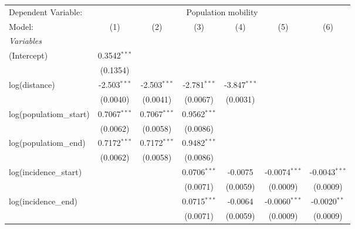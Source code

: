 \documentclass[10pt,a4paper]{article}
\author{Peer Lasse Hinrichsen}
\begin{document}
\begingroup
\centering
\begin{tabular}{lcccccc}
   \tabularnewline \midrule \midrule
   Dependent Variable: & \multicolumn{6}{c}{Population mobility}\\
   Model:                                       & (1)            & (2)            & (3)             & (4)            & (5)             & (6)\\  
   \midrule
   \emph{Variables}\\
   (Intercept)                                  & 0.3542$^{***}$ &                &                 &                &                 &   \\   
                                                & (0.1354)       &                &                 &                &                 &   \\   
   log(distance)                                & -2.503$^{***}$ & -2.503$^{***}$ & -2.781$^{***}$  & -3.847$^{***}$ &                 &   \\   
                                                & (0.0040)       & (0.0041)       & (0.0067)        & (0.0031)       &                 &   \\   
   log(populatiom\_start)                       & 0.7067$^{***}$ & 0.7067$^{***}$ & 0.9562$^{***}$  &                &                 &   \\   
                                                & (0.0062)       & (0.0058)       & (0.0086)        &                &                 &   \\   
   log(populatiom\_end)                         & 0.7172$^{***}$ & 0.7172$^{***}$ & 0.9482$^{***}$  &                &                 &   \\   
                                                & (0.0062)       & (0.0058)       & (0.0086)        &                &                 &   \\   
   log(incidence\_start)                        &                &                & 0.0706$^{***}$  & -0.0075        & -0.0074$^{***}$ & -0.0043$^{***}$\\   
                                                &                &                & (0.0071)        & (0.0059)       & (0.0009)        & (0.0009)\\   
   log(incidence\_end)                          &                &                & 0.0715$^{***}$  & -0.0064        & -0.0060$^{***}$ & -0.0020$^{**}$\\   
                                                &                &                & (0.0071)        & (0.0059)       & (0.0009)        & (0.0009)\\   

\end{tabular}
\end{document}
